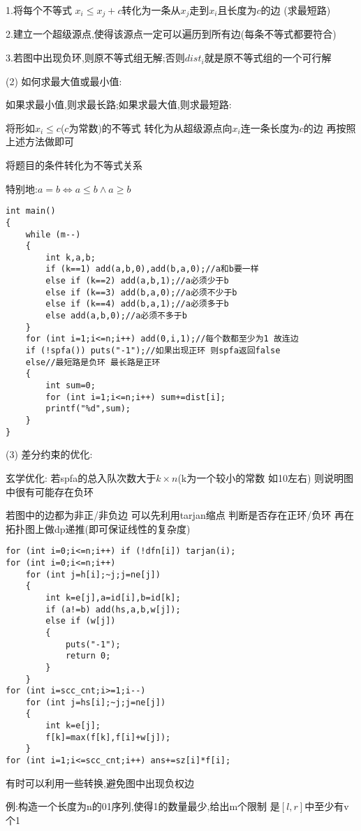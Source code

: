 \documentclass[a4paper]{ctexart}
\begin{document}
1.将每个不等式 $x_i\le x_j+c$转化为一条从$x_j$走到$x_i$且长度为$c$的边 (求最短路)

2.建立一个超级源点,使得该源点一定可以遍历到所有边(每条不等式都要符合)

3.若图中出现负环,则原不等式组无解;否则$dist_i$就是原不等式组的一个可行解

(2) 如何求最大值或最小值:

如果求最小值,则求最长路;如果求最大值,则求最短路:

将形如$x_i\le c$($c$为常数)的不等式 转化为从超级源点向$x_i$连一条长度为$c$的边 再按照上述方法做即可

将题目的条件转化为不等式关系

特别地:$a=b\Leftrightarrow a\le b\land a\ge b$

\begin{lstlisting}
int main()
{
    while (m--)
    {
        int k,a,b;
        if (k==1) add(a,b,0),add(b,a,0);//a和b要一样
        else if (k==2) add(a,b,1);//a必须少于b
        else if (k==3) add(b,a,0);//a必须不少于b
        else if (k==4) add(b,a,1);//a必须多于b
        else add(a,b,0);//a必须不多于b
    }
    for (int i=1;i<=n;i++) add(0,i,1);//每个数都至少为1 故连边
    if (!spfa()) puts("-1");//如果出现正环 则spfa返回false
    else//最短路是负环 最长路是正环
    {
        int sum=0;
        for (int i=1;i<=n;i++) sum+=dist[i];
        printf("%d",sum);
    }
}
\end{lstlisting}

(3) 差分约束的优化:

玄学优化: 若spfa的总入队次数大于$k\times n$(k为一个较小的常数 如10左右)  则说明图中很有可能存在负环

若图中的边都为非正/非负边  可以先利用tarjan缩点 判断是否存在正环/负环 再在拓扑图上做dp递推(即可保证线性的复杂度)

\begin{lstlisting}
for (int i=0;i<=n;i++) if (!dfn[i]) tarjan(i);
for (int i=0;i<=n;i++)
	for (int j=h[i];~j;j=ne[j])
	{
        int k=e[j],a=id[i],b=id[k];
        if (a!=b) add(hs,a,b,w[j]);
        else if (w[j])
        {
            puts("-1");
            return 0;
        }
    }
for (int i=scc_cnt;i>=1;i--)
    for (int j=hs[i];~j;j=ne[j])
    {
        int k=e[j];
        f[k]=max(f[k],f[i]+w[j]);
    }
for (int i=1;i<=scc_cnt;i++) ans+=sz[i]*f[i];
\end{lstlisting}

有时可以利用一些转换,避免图中出现负权边

例:构造一个长度为n的01序列,使得1的数量最少,给出m个限制 是$[l,r]$中至少有v个1
\end{document}
